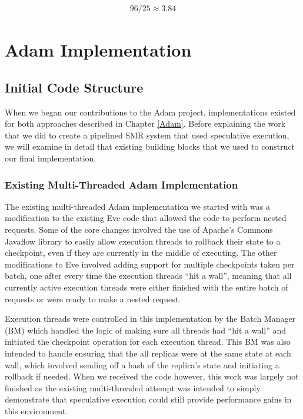 \documentclass[11pt, oneside]{report}
\begin{document}
\begin{align*}
96 / 25 \approx 3.84
\end{align*}

\chapter{Adam Implementation}\label{AdamImplementation}

\section{Initial Code Structure}\label{existing}

When we began our contributions to the Adam project, implementations existed for both approaches described in Chapter \ref{Adam}. 
Before explaining the work that we did to create a pipelined SMR system that used speculative execution, we will examine in detail that existing building blocks that we used to construct our final implementation.

\subsection{Existing Multi-Threaded Adam Implementation}\label{BM}

The existing multi-threaded Adam implementation we started with was a modification to the existing Eve \cite{eve} code that allowed the code to perform nested requests. 
Some of the core changes involved the use of Apache's Commons Javaflow library \cite{javaflow} to easily allow execution threads to rollback their state to a checkpoint, even if they are currently in the middle of executing. 
The other modifications to Eve involved adding support for multiple checkpoints taken per batch, one after every time the execution threads ``hit a wall'', meaning that all currently active execution threads were either finished with the entire batch of requests or were ready to make a nested request.

Execution threads were controlled in this implementation by the Batch Manager (BM) which handled the logic of making sure all threads had ``hit a wall'' and initiated the checkpoint operation for each execution thread. 
This BM was also intended to handle ensuring that the all replicas were at the same state at each wall, which involved sending off a hash of the replica's state and initiating a rollback if needed. 
When we received the code however, this work was largely not finished as the existing multi-threaded attempt was intended to simply demonstrate that speculative execution could still provide performance gains in this environment.
\end{document}
